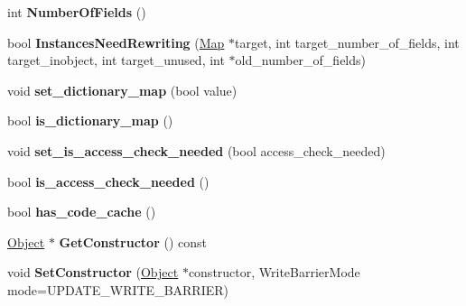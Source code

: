 \begin{DoxyCompactItemize}
\item 
int {\bfseries Number\+Of\+Fields} ()\hypertarget{classv8_1_1internal_1_1_map_a51c719d96f0a96dfaa3209e070a44bb1}{}\label{classv8_1_1internal_1_1_map_a51c719d96f0a96dfaa3209e070a44bb1}

\item 
bool {\bfseries Instances\+Need\+Rewriting} (\hyperlink{classv8_1_1internal_1_1_map}{Map} $\ast$target, int target\+\_\+number\+\_\+of\+\_\+fields, int target\+\_\+inobject, int target\+\_\+unused, int $\ast$old\+\_\+number\+\_\+of\+\_\+fields)\hypertarget{classv8_1_1internal_1_1_map_a022f7551714b8ee4dde04aa6a6e2a916}{}\label{classv8_1_1internal_1_1_map_a022f7551714b8ee4dde04aa6a6e2a916}

\item 
void {\bfseries set\+\_\+dictionary\+\_\+map} (bool value)\hypertarget{classv8_1_1internal_1_1_map_af3463563977ce7d2e4fa5f52879284ee}{}\label{classv8_1_1internal_1_1_map_af3463563977ce7d2e4fa5f52879284ee}

\item 
bool {\bfseries is\+\_\+dictionary\+\_\+map} ()\hypertarget{classv8_1_1internal_1_1_map_a6f2a37aaa50b78b41fecb271b2c83581}{}\label{classv8_1_1internal_1_1_map_a6f2a37aaa50b78b41fecb271b2c83581}

\item 
void {\bfseries set\+\_\+is\+\_\+access\+\_\+check\+\_\+needed} (bool access\+\_\+check\+\_\+needed)\hypertarget{classv8_1_1internal_1_1_map_a1b5ae7473b107ba16b5305aacd5159e0}{}\label{classv8_1_1internal_1_1_map_a1b5ae7473b107ba16b5305aacd5159e0}

\item 
bool {\bfseries is\+\_\+access\+\_\+check\+\_\+needed} ()\hypertarget{classv8_1_1internal_1_1_map_a1d2b5259a72590db05e7a5535d678472}{}\label{classv8_1_1internal_1_1_map_a1d2b5259a72590db05e7a5535d678472}

\item 
bool {\bfseries has\+\_\+code\+\_\+cache} ()\hypertarget{classv8_1_1internal_1_1_map_ac483ffddad675d6ed95fb4e291d2fabf}{}\label{classv8_1_1internal_1_1_map_ac483ffddad675d6ed95fb4e291d2fabf}

\item 
\hyperlink{classv8_1_1internal_1_1_object}{Object} $\ast$ {\bfseries Get\+Constructor} () const \hypertarget{classv8_1_1internal_1_1_map_a9917e2a8fb3371b4afc81bf97dda2570}{}\label{classv8_1_1internal_1_1_map_a9917e2a8fb3371b4afc81bf97dda2570}

\item 
void {\bfseries Set\+Constructor} (\hyperlink{classv8_1_1internal_1_1_object}{Object} $\ast$constructor, Write\+Barrier\+Mode mode=U\+P\+D\+A\+T\+E\+\_\+\+W\+R\+I\+T\+E\+\_\+\+B\+A\+R\+R\+I\+ER)\hypertarget{classv8_1_1internal_1_1_map_a0f9146d3c513e8c37763c89dd86ff71f}{}\label{classv8_1_1internal_1_1_map_a0f9146d3c513e8c37763c89dd86ff71f}


\end{DoxyCompactItemize}
